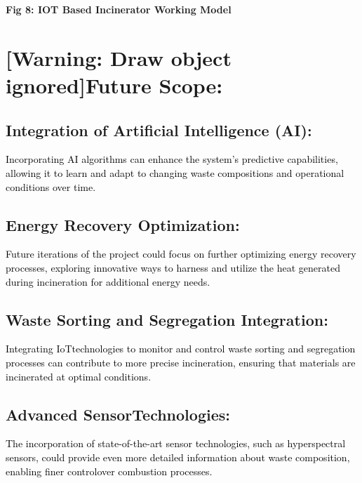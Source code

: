 \documentclass[letterpaper]{article}
\begin{document}
\bigskip


\bigskip


\bigskip


\bigskip


\bigskip


\bigskip


\bigskip

\textbf{Fig 8: IOT Based Incinerator Working Model}

\clearpage\setcounter{page}{1}\pagestyle{Convertedxxii}
\section[Future Scope:]{[Warning: Draw object ignored]Future Scope:}

\bigskip


\bigskip

\subsection{Integration of Artificial Intelligence (AI):}
\textcolor{black}{Incorporating AI algorithms can enhance the system's predictive capabilities, allowing it to learn and
adapt to changing waste compositions and operational conditions over time.}

\subsection{Energy Recovery Optimization:}
\textcolor{black}{Future iterations of the project could focus on further optimizing energy recovery processes,
exploring innovative ways to harness and utilize the heat generated during incineration for additional energy needs.}

\subsection{Waste Sorting and Segregation Integration:}
\textcolor{black}{Integrating IoTtechnologies to monitor and control waste sorting and segregation processes can
contribute to more precise incineration, ensuring that materials are incinerated at optimal conditions.}

\subsection{Advanced SensorTechnologies:}
\textcolor{black}{The incorporation of state-of-the-art sensor technologies, such as hyperspectral sensors, could
provide even more detailed information about waste composition, enabling finer controlover combustion processes.}
\end{document}
